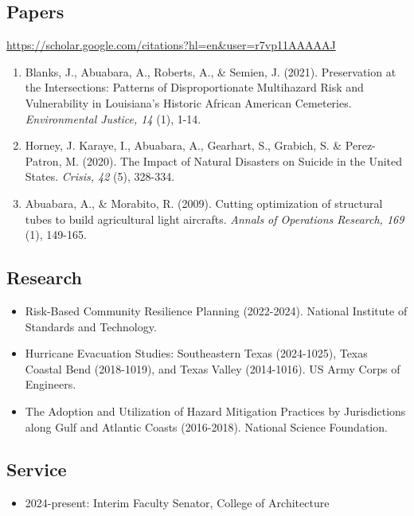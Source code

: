 \documentclass[article,8pt]{article}
\begin{document}
\subsection*{Papers}
\url{https://scholar.google.com/citations?hl=en&user=r7vp11AAAAAJ}
\begin{enumerate}
\item Blanks, J., Abuabara, A., Roberts, A., \& Semien, J. (2021). Preservation at the Intersections: Patterns of Disproportionate Multihazard Risk and Vulnerability in Louisiana's Historic African American Cemeteries. \emph{Environmental Justice, 14} (1), 1-14.
\item Horney, J. Karaye, I., Abuabara, A., Gearhart, S., Grabich, S. \& Perez-Patron, M. (2020). The Impact of Natural Disasters on Suicide in the United States. \emph{Crisis, 42} (5), 328-334.
\item Abuabara, A., \& Morabito, R. (2009). Cutting optimization of structural tubes to build agricultural light aircrafts. \emph{Annals of Operations Research, 169} (1), 149-165.
\end{enumerate}

\subsection*{Research}
\begin{itemize}
\item Risk-Based Community Resilience Planning (2022-2024). National Institute of Standards and Technology.
\item Hurricane Evacuation Studies: Southeastern Texas (2024-1025), Texas Coastal Bend (2018-1019), and Texas Valley (2014-1016). US Army Corps of Engineers.
\item The Adoption and Utilization of Hazard Mitigation Practices by Jurisdictions along Gulf and Atlantic Coasts (2016-2018). National Science Foundation.
\end{itemize}

\subsection*{Service}
\begin{itemize}
\item 2024-present: Interim Faculty Senator, College of Architecture
\end{itemize}

\end{document}
